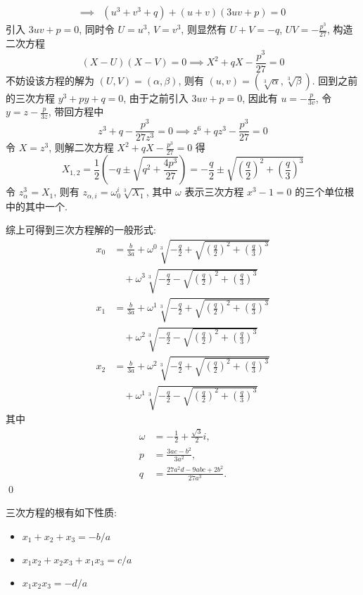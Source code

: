 \begin{solution}
\[\begin{aligned}
\implies & (u^3 + v^3 + q) + (u + v)(3uv + p) = 0
\end{aligned} \]
引入 $3uv + p = 0$, 同时令 $U = u^3$, $V = v^3$, 则显然有 $U + V = -q$,
$UV = -\frac{p^3}{27}$, 构造二次方程
\[ (X - U)(X - V) = 0 \implies X^2 + qX - \frac{p^3}{27} = 0 \]
不妨设该方程的解为 $(U, V) = (\alpha, \beta)$, 则有
$(u, v) = (\sqrt[3]{\alpha}, \sqrt[3]{\beta})$. 回到之前的三次方程
$y^3 + py + q = 0$, 由于之前引入 $3uv + p = 0$, 因此有 $u = -\frac{p}{3v}$, 令
$y = z - \frac{p}{3z}$, 带回方程中
\[ z^3 + q - \frac{p^3}{27z^3} = 0 \implies z^6 + qz^3 - \frac{p^3}{27} = 0 \]
令 $X = z^3$, 则解二次方程 $X^2 + qX - \frac{p^3}{27} = 0$ 得
\[
X_{1, 2} = \frac12 (-q \pm \sqrt{q^2 + \frac{4p^3}{27}})
    = -\frac{q}{2} \pm \sqrt{(\frac{q}{2})^2 + (\frac{q}{3})^3}
\]
令 $z_\alpha^3 = X_1$, 则有 $z_{\alpha, i} = \omega^i_0 \sqrt[3]{X_1}$, 其中
$\omega$ 表示三次方程 $x^3-1 = 0$ 的三个单位根中的其中一个.

综上可得到三次方程解的一般形式:
\[ \begin{aligned}
x_0 &= \frac{b}{3a}+ \omega^{0}
    \sqrt[3]{-\frac{q}{2}+\sqrt{(\frac{q}{2})^2 + (\frac{q}{3})^3}} \\
    &\quad+ \omega^{3}
	\sqrt[3]{-\frac{q}{2}-\sqrt{(\frac{q}{2})^2 + (\frac{q}{3})^3}} \\
x_1 &= \frac{b}{3a} + \omega^{1}
    \sqrt[3]{-\frac{q}{2}+\sqrt{(\frac{q}{2})^2 + (\frac{q}{3})^3}} \\
    &\quad+ \omega^{2}
    \sqrt[3]{-\frac{q}{2}-\sqrt{(\frac{q}{2})^2 + (\frac{q}{3})^3}} \\
x_2 &= \frac{b}{3a} + \omega^{2}
    \sqrt[3]{-\frac{q}{2}+\sqrt{(\frac{q}{2})^2 + (\frac{q}{3})^3}} \\
    &\quad+ \omega^{1}
    \sqrt[3]{-\frac{q}{2}-\sqrt{(\frac{q}{2})^2 + (\frac{q}{3})^3}}
\end{aligned} \]
其中
\[ \begin{aligned}
\omega &= -\frac{1}{2} + \frac{\sqrt{3}}{2} i, \\
p &= \frac{3ac-b^2}{3a^2}, \\
q &= \frac{27a^2d - 9abc + 2b^2}{27a^3}.
\end{aligned} \]
\qed
\end{solution}
\begin{lemma}[韦达定理]
三次方程的根有如下性质:
\begin{itemize}
\item $x_1 + x_2 + x_3 = -b/a$
\item $x_1 x_2 + x_2 x_3 + x_1 x_3 = c/a$
\item $x_1 x_2 x_3 = -d/a$
\end{itemize}
\end{lemma}
\endinput

